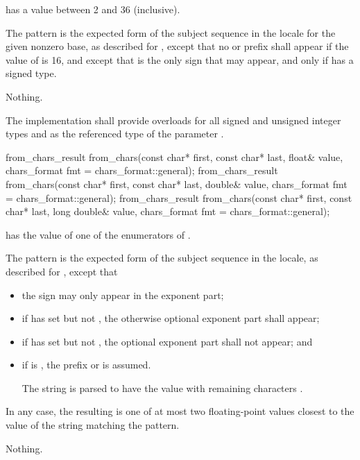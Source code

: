 \begin{itemdescr}
\pnum
\expects
{} has a value between 2 and 36 (inclusive).

\pnum
\effects
The pattern is the expected form of the subject sequence
in the  locale
for the given nonzero base,
as described for ,
except that no  or  prefix shall appear
if the value of  is 16,
and except that 
is the only sign that may appear,
and only if  has a signed type.

\pnum
\throws
Nothing.

\pnum
\remarks
The implementation shall provide overloads
for all signed and unsigned integer types
and 
as the referenced type of the parameter .
\end{itemdescr}

%
\begin{itemdecl}
from_chars_result from_chars(const char* first, const char* last, float& value,
                             chars_format fmt = chars_format::general);
from_chars_result from_chars(const char* first, const char* last, double& value,
                             chars_format fmt = chars_format::general);
from_chars_result from_chars(const char* first, const char* last, long double& value,
                             chars_format fmt = chars_format::general);
\end{itemdecl}

\begin{itemdescr}
\pnum
\expects
{} has the value of
one of the enumerators of .

\pnum
\effects
The pattern is the expected form of the subject sequence
in the  locale,
as described for ,
except that
\begin{itemize}
\item
the sign  may only appear in the exponent part;
\item
if  has  set
but not ,
the otherwise optional exponent part shall appear;
\item
if  has  set
but not ,
the optional exponent part shall not appear; and
\item
if  is ,
the prefix  or  is assumed.
\begin{example}
The string 
is parsed to have the value
with remaining characters .
\end{example}
\end{itemize}
In any case, the resulting  is one of
at most two floating-point values
closest to the value of the string matching the pattern.

\pnum
\throws
Nothing.
\end{itemdescr}

